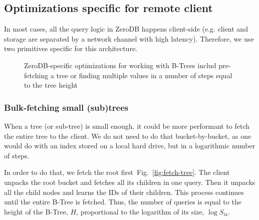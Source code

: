 \documentclass[notitlepage,longbibliography]{revtex4-1}
\newcommand{\figref}[1]{Fig.~\ref{#1}}
\begin{document}
\subsection{Optimizations specific for remote client}

In most cases, all the query logic in ZeroDB happens client-side (e.g. client and storage are separated by a network channel with high latency).
Therefore, we use two primitives specific for this architecture.

\begin{figure}
	\begin{center}
        \qquad
	\end{center}
    \caption{ZeroDB-specific optimizations for working with B-Trees includ pre-fetching a tree or finding multiple values in a number of steps equal to the tree height}
	\label{fig:tree-traversal-optimizations}
\end{figure}

\subsubsection{Bulk-fetching small (sub)trees}
\label{sec:bulk-fetching}

When a tree (or sub-tree) is small enough, it could be more performant to fetch the entire tree to the client.
We do not need to do that bucket-by-bucket, as one would do with an index stored on a local hard drive, but in a logarithmic number of steps.

In order to do that, we fetch the root first~\figref{fig:fetch-tree}.
The client unpacks the root bucket and fetches all its children in one query.
Then it unpacks all the child nodes and learns the IDs of their children.
This process continues until the entire B-Tree is fetched.
Thus, the number of queries is equal to the height of the B-Tree, $H$, proportional to the logarithm of its size, $\log{S_{\mbox{ix}}}$.
\end{document}
